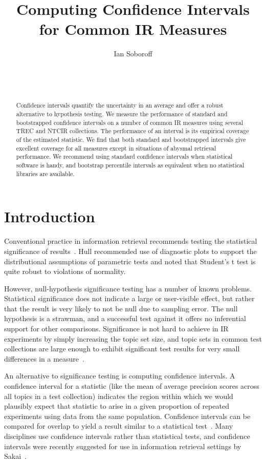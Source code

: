 \documentclass{sig-alt-release-2013}
\title{Computing Confidence Intervals for Common IR Measures}
\author{
  \alignauthor
  Ian Soboroff\\
  \affaddr{National Institute of Standards and Technology}\\
  \affaddr{100 Bureau Drive, Gaithersburg, MD, 20899-8940 USA}\\
  \affaddr{ian.soboroff@nist.gov}\\
}
\begin{document}

\maketitle

\begin{abstract}
Confidence intervals quantify the uncertainty in an average and offer a robust alternative to hypothesis testing.  We measure the performance of standard and bootstrapped confidence intervals on a number of common IR measures using several TREC and NTCIR collections.  The performance of an interval is its empirical coverage of the estimated statistic.  We find that both standard and bootstrapped intervals give excellent coverage for all measures except in situations of abysmal retrieval performance.  We recommend using standard confidence intervals when statistical software is handy, and bootstrap percentile intervals as equivalent when no statistical libraries are available.
\end{abstract}

\section{Introduction}

Conventional practice in information retrieval recommends testing the statistical significance of results~\cite{Hull93}. Hull recommended use of diagnostic plots to support the distributional assumptions of parametric tests and noted that Student's t test is quite robust to violations of normality.

However, null-hypothesis significance testing has a number of known problems. Statistical significance does not indicate a large or user-visible effect, but rather that the result is very likely to not be null due to sampling error.  The null hypothesis is a strawman, and a successful test against it offers no inferential support for other comparisons.  Significance is not hard to achieve in IR experiments by simply increasing the topic set size, and topic sets in common test collections are large enough to exhibit significant test results for very small differences in a measure~\cite{Cumming12}.

An alternative to significance testing is computing confidence intervals.  A confidence interval for a statistic (like the mean of average precision scores across all topics in a test collection) indicates the region within which we would plausibly expect that statistic to arise in a given proportion of repeated experiments using data from the same population.  Confidence intervals can be compared for overlap to yield a result similar to a statistical test~\cite{Cumming05}. Many disciplines use confidence intervals rather than statistical tests, and confidence intervals were recently suggested for use in information retrieval settings by Sakai~\cite{Sakai14-forum}.
\end{document}
